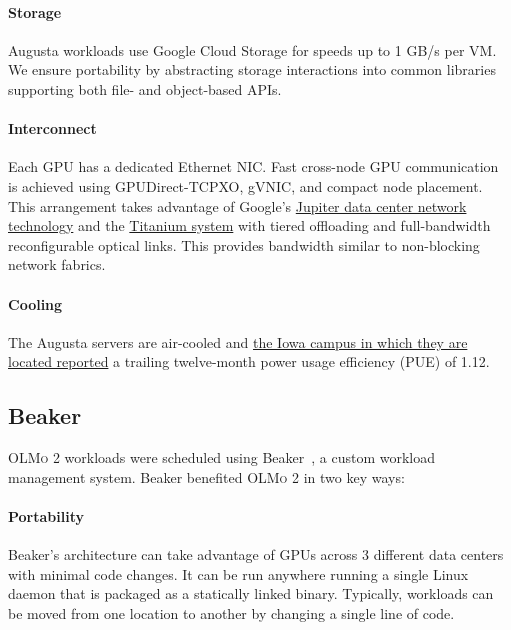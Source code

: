 \documentclass[table]{ai2style/ai2}
\newcommand{\olmotoo}{\textsc{OLMo 2}\xspace}
\begin{document}
\paragraph{Storage} Augusta workloads use Google Cloud Storage for speeds up to 1 GB/s per VM. We ensure portability by abstracting storage interactions into common libraries supporting both file- and object-based APIs.

\paragraph{Interconnect} Each GPU has a dedicated Ethernet NIC. Fast cross-node GPU communication is achieved using GPUDirect-TCPXO, gVNIC, and compact node placement. This arrangement takes advantage of Google's \href{https://cloud.google.com/blog/topics/systems/the-evolution-of-googles-jupiter-data-center-network}{Jupiter data center network technology} and the \href{https://cloud.google.com/blog/products/compute/titanium-underpins-googles-workload-optimized-infrastructure}{Titanium system} with tiered offloading and full-bandwidth reconfigurable optical links. This provides bandwidth similar to non-blocking network fabrics.

\paragraph{Cooling} The Augusta servers are air-cooled and \href{https://www.google.com/about/datacenters/efficiency/}{the Iowa campus in which they are located reported} a trailing twelve-month power usage efficiency (PUE) of 1.12.

\subsection{Beaker}

\olmotoo workloads were scheduled using Beaker~\citep{beaker2022}, a custom workload management system. 
Beaker benefited \olmotoo in two key ways:

\paragraph{Portability} Beaker's architecture can take advantage of GPUs across 3 different data centers with minimal code changes.  
It can be run anywhere running a single Linux daemon that is packaged as a statically linked binary. 
Typically, workloads can be moved from one location to another by changing a single line of code.
\end{document}
